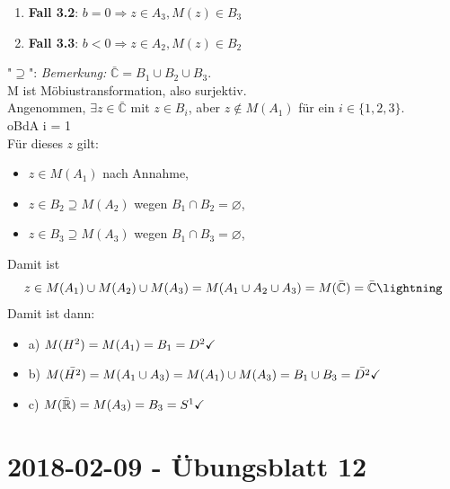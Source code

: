 \begin{problem*}[4]
\begin{enumerate}
  \item \textbf{Fall 3.2}: $b = 0 \Rightarrow z \in A_3, M(z) \in B_3$
  \item \textbf{Fall 3.3}: $b < 0 \Rightarrow z \in A_2, M(z) \in B_2$
\end{enumerate}
"$\supseteq$": \emph{Bemerkung:} $\bar{\mathbb{C}} = B_1 \cup B_2 \cup B_3$. \\
M ist Möbiustransformation, also surjektiv. \\
Angenommen, $\exists z \in \bar{\mathbb{C}}$ mit $z \in B_i$, aber $z \notin M(A_1)$ für ein $i \in \{ 1, 2, 3 \}$.\\
oBdA i = 1\\
Für dieses $ z $ gilt:
\begin{itemize}
  \item $z \in M(A_1)$ nach Annahme,
  \item $z \in B_2 \supseteq M(A_2)$ wegen $B_1 \cap B_2 = \varnothing$,
  \item $z \in B_3 \supseteq M(A_3)$ wegen $B_1 \cap B_3 = \varnothing$,
\end{itemize}
Damit ist
\begin{equation*}
z \in M(A_1) \cup M(A_2) \cup M(A_3) = M(A_1 \cup A_2 \cup A_3) = M(\bar{\mathbb{C}}) = \bar{\mathbb{C}} \hfill \lightning
\end{equation*}
Damit ist dann:
\begin{itemize}
  \item a) $M(H^2) = M(A_1) = B_1 = D^2 \hfill \checkmark $ 
  \item b) $M(\bar{H^2}) = M(A_1 \cup A_3) = M(A_1) \cup M(A_3) = B_1 \cup B_3 = \bar{D^2} \hfill \checkmark $
  \item c) $M(\bar{ \mathbb{R} }) = M(A_3) = B_3 = S^1 \hfill  \checkmark  $
\end{itemize}

\end{problem*}

\section{2018-02-09 - Übungsblatt 12 } %
\label{sec:übungsblatt_12}

